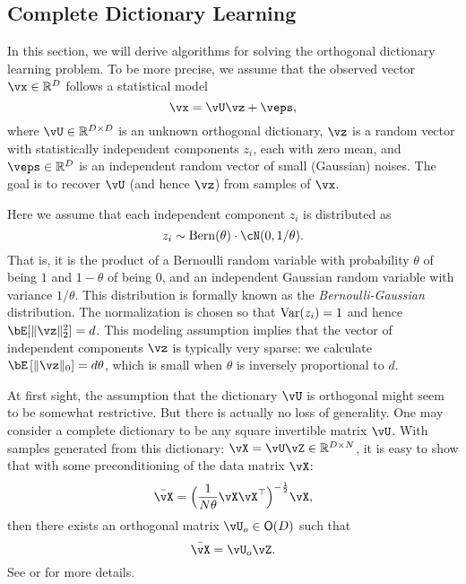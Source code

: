 \documentclass[../../book-main.tex]{subfiles}
\begin{document}
\subsection{Complete Dictionary Learning}
\label{sec:complete-dictionary}

In this section, we will derive algorithms for solving the orthogonal dictionary learning problem. To be more precise,  we assume that the observed vector $\vx \in \R^D$ follows a statistical model
\begin{equation}
    \vx = \vU \vz + \veps, 
    \label{eq:ica-model-ch2}
\end{equation}
where $\vU \in \R^{D \times D}$ is an unknown orthogonal dictionary, $\vz$ is a random vector with statistically independent components $z_i$, each with zero mean, and $\veps \in \R^D$ is an independent random vector of small (Gaussian) noises. The goal is to recover $\vU$ (and hence $\vz$) from samples of $\vx$.

Here we assume that each independent component $z_i$ is distributed as $$z_i \sim \mathrm{Bern}(\theta) \cdot \cN(0, 1/\theta).$$ That is, it is the product of a Bernoulli random variable with probability $\theta$ of being $1$ and $1-\theta$ of being $0$, and an independent Gaussian random variable with variance $1/\theta$. This distribution is formally known as the {\em Bernoulli-Gaussian} distribution. 
The normalization is chosen so that $\operatorname{Var}(z_i) = 1$ and hence $\bE[\norm{\vz}_2^2]=d$. 
This modeling assumption implies that the vector of independent components $\vz$ is typically very sparse: 
we calculate $\bE\left[\norm{\vz}_0\right] = d\theta$, which is small when $\theta$ is inversely proportional to $d$. 

\begin{remark} 
At first sight, the assumption that the dictionary $\vU$ is orthogonal might seem to be somewhat restrictive. But there is actually no loss of generality. One may consider a complete dictionary to be any square invertible matrix $\vU$. With samples generated from this dictionary: $\vX = \vU \vZ \in \mathbb{R}^{D\times N}$, it is easy to show that with some preconditioning of the data matrix $\vX$: 
\begin{equation}
    \bar{\vX} = \Big(\frac{1}{N\theta} \vX\vX^\top\Big)^{-\frac{1}{2}}\vX,
\end{equation}
then there exists an orthogonal matrix $\vU_{o} \in \O(D)$ such that
\begin{equation}
    \bar{\vX} = \vU_{o}\vZ.
\end{equation}
    See  or \cite{sun2017completeI} for more details.
\end{remark}
\end{document}
